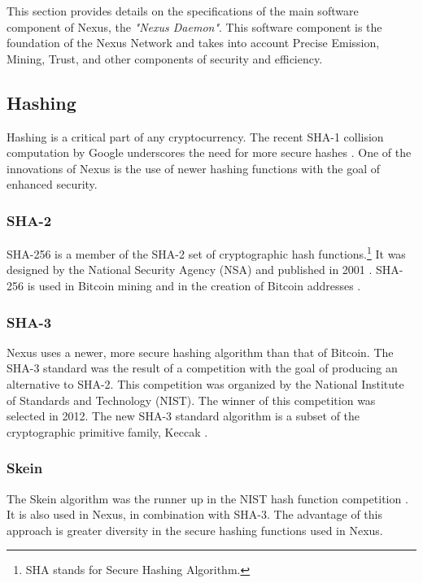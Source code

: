\documentclass[11pt]{article}
\begin{document}
This section provides details on the specifications of the main software component of Nexus, the \textit{"Nexus Daemon"}.
This software component is the foundation of the Nexus Network and takes into account Precise Emission, Mining, Trust, and other components of security and efficiency. 

\subsection{Hashing}

Hashing is a critical part of any cryptocurrency.
The recent SHA-1 collision computation by Google underscores the need for more secure hashes \cite{googlesha1}. 
One of the innovations of Nexus is the use of newer hashing functions with the goal of enhanced security.

\subsubsection{SHA-2}

SHA-256 is a member of the SHA-2 set of cryptographic hash functions.\footnote{SHA stands for Secure Hashing Algorithm.}
It was designed by the National Security Agency (NSA) and published in 2001 \cite{wikisha2}.
SHA-256 is used in Bitcoin mining and in the creation of Bitcoin addresses \cite{bitwiki256}.

\subsubsection{SHA-3}

Nexus uses a newer, more secure hashing algorithm than that of Bitcoin.
The SHA-3 \cite{sha3} standard was the result of a competition \cite{nistcompetitionend} with the goal of producing an alternative to SHA-2.
This competition was organized by the National Institute of Standards and Technology (NIST).
The winner of this competition was selected in 2012.
The new SHA-3 standard algorithm is a subset of the cryptographic primitive family, Keccak \cite{nistgovk}.

\subsubsection{Skein}

The Skein algorithm was the runner up in the NIST hash function competition \cite{wikiskein}.
It is also used in Nexus, in combination with SHA-3.
The advantage of this approach is greater diversity in the secure hashing functions used in Nexus.
\end{document}
